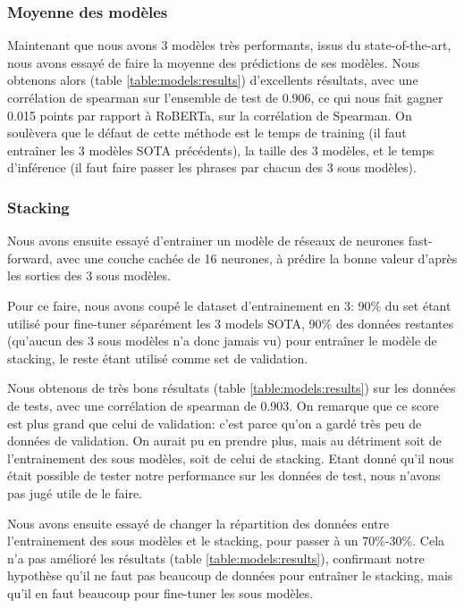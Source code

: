 \documentclass[11pt,a4paper, french]{article}
\begin{document}
%
\subsubsection{Moyenne des modèles}

Maintenant que nous avons 3 modèles très performants, issus du state-of-the-art, nous avons essayé de faire la moyenne des prédictions de ses modèles. Nous obtenons alors (table \ref{table:models:results}) d'excellents résultats, avec une corrélation de spearman sur l'ensemble de test de 0.906, ce qui nous fait gagner 0.015 points par rapport à RoBERTa, sur la corrélation de Spearman. On soulèvera que le défaut de cette méthode est le temps de training (il faut entraîner les 3 modèles SOTA précédents), la taille des 3 modèles, et le temps d'inférence (il faut faire passer les phrases par chacun des 3 sous modèles).

%
\subsubsection{Stacking}

Nous avons ensuite essayé d'entrainer un modèle de réseaux de neurones fast-forward, avec une couche cachée de 16 neurones, à prédire la bonne valeur d'après les sorties des 3 sous modèles.

Pour ce faire, nous avons coupé le dataset d'entrainement en 3: 90\% du set étant utilisé pour fine-tuner séparément les 3 models SOTA, 90\% des données restantes (qu'aucun des 3 sous modèles n'a donc jamais vu) pour entraîner le modèle de stacking, le reste étant utilisé comme set de validation.

Nous obtenons de très bons résultats (table \ref{table:models:results}) sur les données de tests, avec une corrélation de spearman de 0.903. On remarque que ce score est plus grand que celui de validation: c'est parce qu'on a gardé très peu de données de validation. On aurait pu en prendre plus, mais au détriment soit de l'entrainement des sous modèles, soit de celui de stacking. Etant donné qu'il nous était possible de tester notre performance sur les données de test, nous n'avons pas jugé utile de le faire.

Nous avons ensuite essayé de changer la répartition des données entre l'entrainement des sous modèles et le stacking, pour passer à un 70\%-30\%. Cela n'a pas amélioré les résultats (table \ref{table:models:results}), confirmant notre hypothèse qu'il ne faut pas beaucoup de données pour entraîner le stacking, mais qu'il en faut beaucoup pour fine-tuner les sous modèles.
\end{document}
